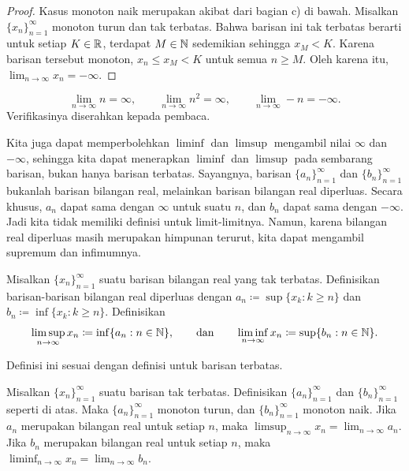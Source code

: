 \begin{proof}
Kasus monoton naik merupakan akibat dari
 bagian c) di bawah.
Misalkan $\{x_n\}_{n=1}^\infty$ monoton turun dan tak terbatas.
Bahwa barisan ini tak terbatas berarti
untuk setiap $K \in {\mathbb{R}}$, terdapat $M \in {\mathbb{N}}$ sedemikian sehingga $x_M < K$.
Karena barisan tersebut monoton, $x_n \leq x_M < K$ untuk semua $n \geq M$.
Oleh karena itu, $\lim_{n\to\infty} x_n = -\infty$.
\end{proof}

\begin{example}
\begin{equation*}
\lim_{n\to \infty} n = \infty,
\qquad
\lim_{n\to \infty} n^2 = \infty,
\qquad
\lim_{n\to \infty} -n = -\infty.
\end{equation*}
Verifikasinya diserahkan kepada pembaca.
\end{example}

Kita juga dapat memperbolehkan $\liminf$ dan $\limsup$ mengambil
nilai $\infty$ dan $-\infty$, sehingga
kita dapat menerapkan $\liminf$ dan $\limsup$
pada sembarang barisan, bukan hanya
barisan terbatas.  Sayangnya, barisan $\{ a_n \}_{n=1}^\infty$ dan
$\{ b_n \}_{n=1}^\infty$
bukanlah barisan bilangan real, melainkan barisan bilangan real diperluas.  Secara
khusus, $a_n$ dapat sama dengan $\infty$ untuk suatu $n$, dan $b_n$ dapat sama dengan
$-\infty$.  Jadi kita tidak memiliki definisi untuk limit-limitnya.
Namun, karena bilangan real diperluas masih merupakan himpunan terurut, kita
dapat mengambil supremum dan infimumnya.

\begin{defn}
Misalkan $\{ x_n \}_{n=1}^\infty$ suatu barisan bilangan real yang tak terbatas.  Definisikan
barisan-barisan bilangan real diperluas dengan
$a_n \coloneqq \sup \{ x_k : k \geq n \}$ dan
$b_n \coloneqq \inf \{ x_k : k \geq n \}$.
Definisikan
\begin{equation*}
\limsup_{n \to \infty} x_n \coloneqq \inf \{ a_n : n \in {\mathbb{N}} \}, \qquad \text{dan} \qquad
\liminf_{n \to \infty} x_n \coloneqq \sup \{ b_n : n \in {\mathbb{N}} \}.
\end{equation*}
\end{defn}

Definisi ini sesuai dengan definisi untuk barisan
terbatas.

\begin{prop}
Misalkan $\{ x_n \}_{n=1}^\infty$ suatu barisan tak terbatas.  Definisikan
$\{ a_n \}_{n=1}^\infty$ dan $\{ b_n \}_{n=1}^\infty$ seperti di atas.
Maka $\{ a_n \}_{n=1}^\infty$ monoton turun, dan $\{ b_n \}_{n=1}^\infty$ monoton naik.
Jika $a_n$ merupakan bilangan real untuk setiap $n$, maka
$\limsup_{n\to\infty} x_n = \lim_{n\to\infty} a_n$.
Jika $b_n$ merupakan bilangan real untuk setiap $n$, maka
$\liminf_{n\to\infty} x_n = \lim_{n\to\infty} b_n$.
\end{prop}

